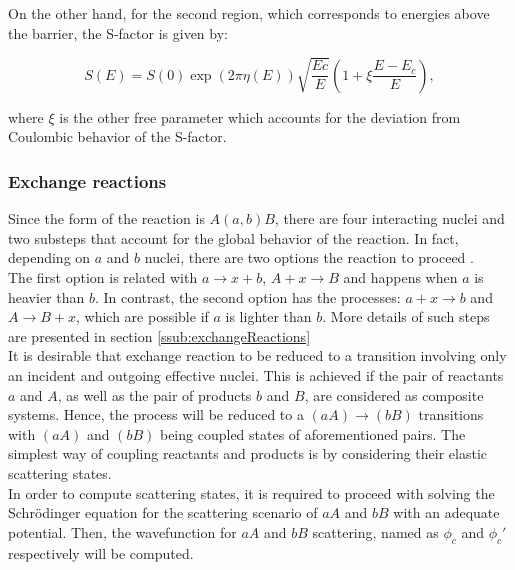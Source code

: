 \documentclass[openany]{book}
\begin{document}
On the other hand, for the second region, which corresponds to energies above the barrier, the S-factor is given by:

\begin{equation}  \label{eq:potential_Yakovlev_sfactor_aboveBarrier}
	S(E) = S(0) \exp ({2\pi\eta(E)}) \sqrt{\frac{Ec}{E}} \left( 1 + \xi\frac{E - E_c}{E} \right),
\end{equation}

where $\xi$ is the other free parameter which accounts for the deviation from Coulombic behavior of the S-factor.  \\

\subsubsection{Exchange reactions} \label{ssub:potential_calculations_exchange}

Since the form of the reaction is $A(a, b)B$, there are four interacting nuclei and two substeps that account for the global behavior of the reaction. In fact, depending on  $a$ and $b$ nuclei, there are two options the reaction to proceed \cite{xu_takahashi_goriely_arnould_ohta_utsunomiya_2013}. \\

The first option is related with $ a \rightarrow x + b$,  $A + x \rightarrow B$ and happens when $a$ is heavier than $b$. In contrast, the second option has the processes: $a + x \rightarrow b$ and $A \rightarrow B + x$, which are possible if $a$ is lighter than $b$. More details of such steps are presented in section \ref{ssub:exchangeReactions} \\

It is desirable that exchange reaction to be reduced to a transition involving only an incident and outgoing effective nuclei. This is achieved if the pair of reactants $a$ and $A$, as well as the pair of products $b$ and $B$, are considered as composite systems. Hence, the process will be reduced to a $(aA) \rightarrow (bB)$ transitions with $(aA)$ and $(bB)$ being coupled states of aforementioned pairs. The simplest way of coupling reactants and products is by considering their elastic scattering states. \\

In order to compute scattering states, it is required to proceed with solving the Schrödinger equation for the scattering scenario of $aA$ and $bB$ with an adequate potential. Then, the wavefunction for $aA$ and $bB$ scattering, named as  $\phi_c$ and $\phi_c'$ respectively will be computed. \\
\end{document}
